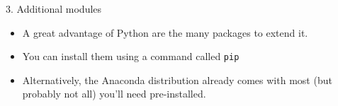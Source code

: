 \begin{frame}{3. Additional modules}
	\begin{itemize}
		\item A great advantage of Python are the many packages to extend it. 
		\item You can install them using a command called \texttt{pip}
		\item Alternatively, the Anaconda distribution already comes with most (but probably not all) you'll need pre-installed.
	\end{itemize}
\end{frame}

